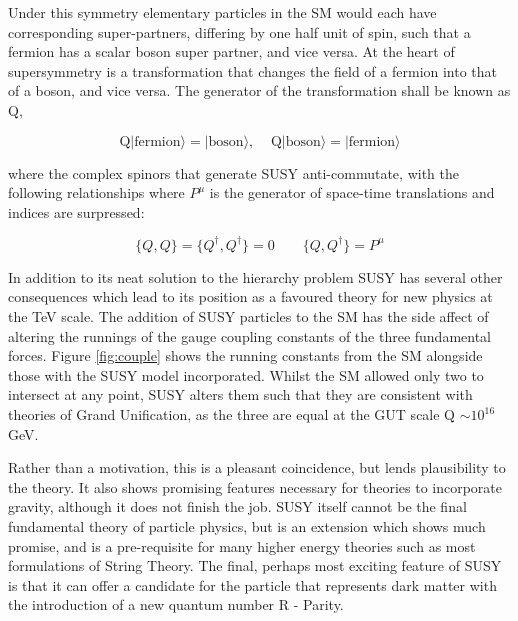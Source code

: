 Under this symmetry elementary particles in the SM would each have corresponding super-partners, differing by one half unit of spin, such that a fermion has a scalar boson super partner, and vice versa. At the heart of supersymmetry is a transformation that changes the field of a fermion into that of a boson, and vice versa. The generator of the transformation shall be known as Q,

\begin{equation}
\textrm{Q}|\textrm{fermion}\rangle = |\textrm{boson}\rangle,  \; \; \; \;  \textrm{Q}|\textrm{boson}\rangle = |\textrm{fermion}\rangle  
\label{eqn:Q}
\end{equation}

where the complex spinors that generate SUSY anti-commutate, with the following relationships where $P^{\mu}$ is the generator of space-time translations and indices are surpressed:


\begin{equation}
\{Q,Q\} = \{Q^{\dagger},Q^{\dagger}\} = 0 \qquad \{Q,Q^{\dagger}\} = P^{\mu} 
\end{equation} 



In addition to its neat solution to the hierarchy problem SUSY has several other consequences which lead to its position as a favoured theory for new physics at the TeV scale. The addition of SUSY particles to the SM has the side affect of altering the runnings of the gauge coupling constants of the three fundamental forces. Figure \ref{fig:couple} shows the running constants from the SM alongside those with the SUSY model incorporated. Whilst the SM allowed only two to intersect at any point, SUSY alters them such that they are consistent with theories of Grand Unification, as the three are equal at the GUT scale Q $\sim 10^{16}$ GeV. 

Rather than a motivation, this is a pleasant coincidence, but lends plausibility to the theory. It also shows promising features necessary for theories to incorporate gravity, although it does not finish the job. SUSY itself cannot be the final fundamental theory of particle physics, but is an extension which shows much promise, and is a pre-requisite for many higher energy theories such as most formulations of String Theory\cite{Dine}. The final, perhaps most exciting feature of SUSY is that it can offer a candidate for the particle that represents dark matter with the introduction of a new quantum number R - Parity. 

